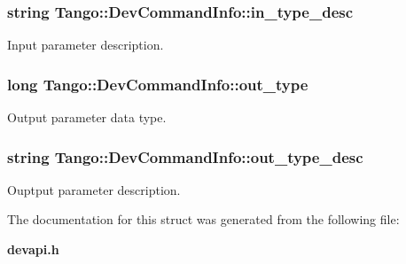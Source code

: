 \subsubsection[{in\-\_\-type\-\_\-desc}]{\setlength{\rightskip}{0pt plus 5cm}string Tango\-::\-Dev\-Command\-Info\-::in\-\_\-type\-\_\-desc}\label{structTango_1_1DevCommandInfo_ace0c93f7dfa9891f9e5845abbb8debaf}


Input parameter description. 

\subsubsection[{out\-\_\-type}]{\setlength{\rightskip}{0pt plus 5cm}long Tango\-::\-Dev\-Command\-Info\-::out\-\_\-type}\label{structTango_1_1DevCommandInfo_a6719a1b6a0396a2867b1b9fbd09cfe74}


Output parameter data type. 

\subsubsection[{out\-\_\-type\-\_\-desc}]{\setlength{\rightskip}{0pt plus 5cm}string Tango\-::\-Dev\-Command\-Info\-::out\-\_\-type\-\_\-desc}\label{structTango_1_1DevCommandInfo_a21c04c4239a3c5657af2378aed451c1e}


Ouptput parameter description. 



The documentation for this struct was generated from the following file\-:\begin{DoxyCompactItemize}
\item 
{\bf devapi.\-h}\end{DoxyCompactItemize}

